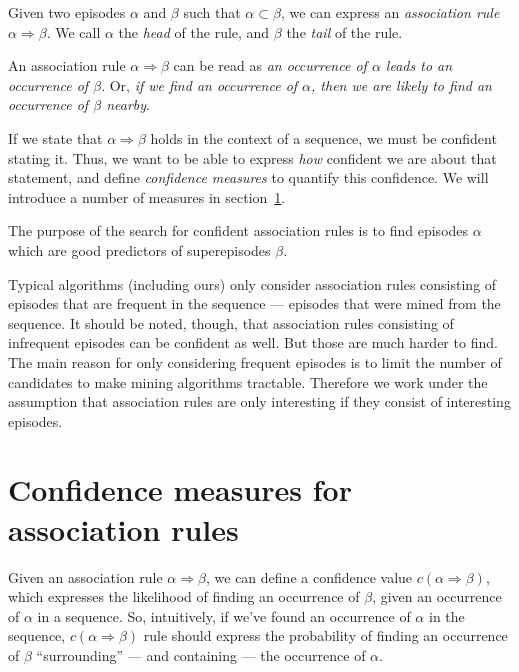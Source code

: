 \begin{definition}
Given two episodes $ \alpha $ and $ \beta $ such that $ \alpha \subset \beta $, we can express an \emph{association rule} $ \alpha \Rightarrow \beta $. We call $ \alpha $ the \emph{head} of the rule, and $ \beta $ the \emph{tail} of the rule.
\end{definition}

An association rule $ \alpha \Rightarrow \beta $ can be read as \emph{an occurrence of $ \alpha $ leads to an occurrence of $ \beta $}. Or, \emph{if we find an occurrence of $ \alpha $, then we are likely to find an occurrence of $ \beta $ nearby}.

If we state that $ \alpha \Rightarrow \beta $ holds in the context of a sequence, we must be confident stating it. Thus, we want to be able to express \emph{how} confident we are about that statement, and define \emph{confidence measures} to quantify this confidence. We will introduce a number of measures in section~\ref{sec:interestingness-measures-association-rules}.

The purpose of the search for confident association rules is to find episodes $ \alpha $ which are good predictors of superepisodes $ \beta $.

Typical algorithms (including ours) only consider association rules consisting of episodes that are frequent in the sequence --- episodes that were mined from the sequence. It should be noted, though, that association rules consisting of infrequent episodes can be confident as well. But those are much harder to find. The main reason for only considering frequent episodes is to limit the number of candidates to make mining algorithms tractable. Therefore we work under the assumption that association rules are only interesting if they consist of interesting episodes.

\section{Confidence measures for association rules}
\label{sec:interestingness-measures-association-rules}

Given an association rule $ \alpha \Rightarrow \beta $, we can define a confidence value $ c(\alpha \Rightarrow \beta) $, which expresses the likelihood of finding an occurrence of $ \beta $, given an occurrence of $ \alpha $ in a sequence. So, intuitively, if we've found an occurrence of $ \alpha $ in the sequence, $ c(\alpha \Rightarrow \beta) $ rule should express the probability of finding an occurrence of $ \beta $ ``surrounding'' --- and containing --- the occurrence of $ \alpha $.

